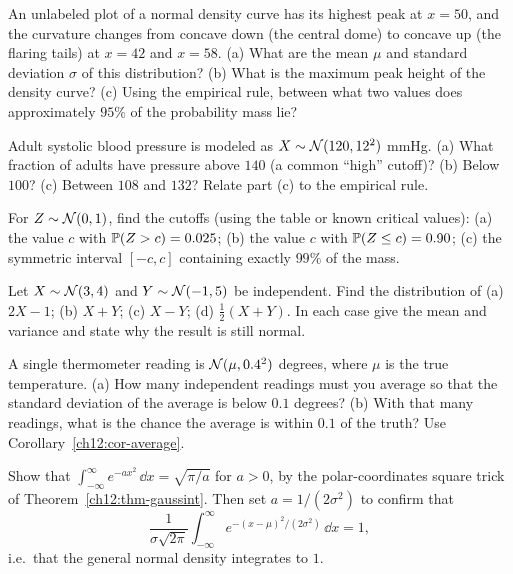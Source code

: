 \begin{exercise}
\label{ch12:exr-inflection}
An unlabeled plot of a normal density curve has its highest peak at $x = 50$,
and the curvature changes from concave down (the central dome) to concave up (the
flaring tails) at $x = 42$ and $x = 58$.
(a) What are the mean $\mu$ and standard deviation $\sigma$ of this distribution?
(b) What is the maximum peak height of the density curve?
(c) Using the empirical rule, between what two values does approximately $95\%$
of the probability mass lie?
\end{exercise}

\begin{exercise}[Standardizing]
\label{ch12:exr-standardize}
Adult systolic blood pressure is modeled as $X \sim \Normal(120, 12^2)$ mmHg.
(a) What fraction of adults have pressure above $140$ (a common ``high'' cutoff)?
(b) Below $100$? (c) Between $108$ and $132$? Relate part (c) to the empirical
rule.
\end{exercise}

\begin{exercise}
\label{ch12:exr-inverse}
For $Z \sim \Normal(0,1)$, find the cutoffs (using the table or known critical
values): (a) the value $c$ with $\P(Z > c) = 0.025$; (b) the value $c$ with
$\P(Z \le c) = 0.90$; (c) the symmetric interval $[-c, c]$ containing exactly
$99\%$ of the mass.
\end{exercise}

\begin{exercise}
\label{ch12:exr-sum}
Let $X \sim \Normal(3, 4)$ and $Y \sim \Normal(-1, 5)$ be independent.
Find the distribution of (a) $2X - 1$; (b) $X + Y$; (c) $X - Y$;
(d) $\tfrac{1}{2}(X + Y)$. In each case give the mean and variance and state why
the result is still normal.
\end{exercise}

\begin{exercise}
\label{ch12:exr-average}
A single thermometer reading is $\Normal(\mu, 0.4^2)$ degrees, where $\mu$ is the
true temperature. (a) How many independent readings must you average so that the
standard deviation of the average is below $0.1$ degrees? (b) With that many
readings, what is the chance the average is within $0.1$ of the truth? Use
Corollary~\ref{ch12:cor-average}.
\end{exercise}

\begin{exercise}
\label{ch12:exr-gaussint}
Show that $\int_{-\infty}^{\infty} e^{-a x^2}\,\dd x = \sqrt{\pi/a}$ for $a > 0$,
by the polar-coordinates square trick of Theorem~\ref{ch12:thm-gaussint}. Then set
$a = 1/(2\sigma^2)$ to confirm that
\[
  \frac{1}{\sigma\sqrt{2\pi}}\int_{-\infty}^{\infty} e^{-(x-\mu)^2/(2\sigma^2)}\,\dd x = 1,
\]
i.e.\ that the general normal density integrates to $1$.
\end{exercise}

